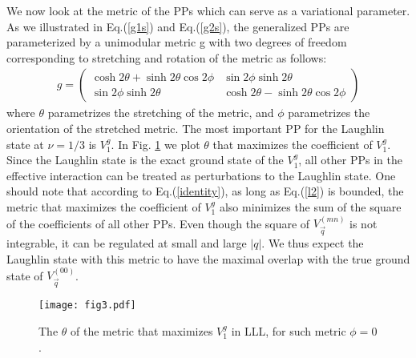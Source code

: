 \documentclass[twocolumn,showpacs,amsmath,amstex,amssymb,mathfonts,prb]{revtex4-1}
\begin{document}
We now look at the metric of the PPs which can serve as a variational parameter. As we illustrated in Eq.(\ref{g1s}) and Eq.(\ref{g2s}), the generalized PPs are parameterized by a unimodular metric g with two degrees of freedom corresponding to stretching and rotation of the metric as follows:
\footnotesize
\begin{eqnarray}\label{g}
g=\left(\begin{array}{ccc}
\cosh 2\theta+\sinh 2\theta\cos 2\phi & \sin 2\phi\sinh 2\theta\\
\sin 2\phi\sinh 2\theta & \cosh 2\theta-\sinh 2\theta\cos 2\phi\end{array}\right)
\end{eqnarray}
\normalsize
where $\theta$ parametrizes the stretching of the metric, and $\phi$ parametrizes the orientation of the stretched metric. The most important PP for the Laughlin state at $\nu=1/3$ is $V^g_1$. In Fig. \ref{LLLtheta} we plot $\theta$ that maximizes the coefficient of $V^g_1$. Since the Laughlin state is the exact ground state of the $V^g_1$, all other PPs in the effective interaction can be treated as perturbations to the Laughlin state. One should note that according to Eq.(\ref{identity}), as long as Eq.(\ref{l2}) is bounded, the metric that maximizes the coefficient of $V^g_1$ also minimizes the sum of the square of the coefficients of all other PPs. Even though the square of $V_{\vec q}^{\left(mn\right)}$ is not integrable, it can be regulated\cite{ippoliti} at small and large $|q|$. We thus expect the Laughlin state with this metric to have the maximal overlap with the true ground state of $V_{\vec q}^{\left(00\right)}$.
\begin{figure}[htb]
\texttt{[image: fig3.pdf]}
\caption{The $\theta$ of the metric that maximizes $V^g_1$ in LLL, for such metric $\phi=0$.}
\label{LLLtheta}
\end{figure}  
\end{document}
